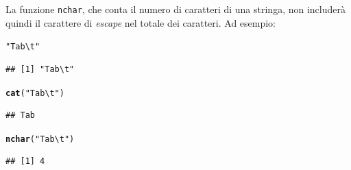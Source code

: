 \documentclass[onecolumn,12pt]{book}\usepackage[]{graphicx}\usepackage[]{color}
\makeatletter
\newcommand{\hlstr}[1]{\textcolor[rgb]{0.192,0.494,0.8}{#1}}%
\newcommand{\hlstd}[1]{\textcolor[rgb]{0.345,0.345,0.345}{#1}}%
\newcommand{\hlkwd}[1]{\textcolor[rgb]{0.737,0.353,0.396}{\textbf{#1}}}%
\newenvironment{kframe}{%
 \def\at@end@of@kframe{}%
 \ifinner\ifhmode%
  \def\at@end@of@kframe{\end{minipage}}%
  \begin{minipage}{\columnwidth}%
 \fi\fi%
 \def\FrameCommand##1{\hskip\@totalleftmargin \hskip-\fboxsep
 \colorbox{shadecolor}{##1}\hskip-\fboxsep
     \hskip-\linewidth \hskip-\@totalleftmargin \hskip\columnwidth}%
 \MakeFramed {\advance\hsize-\width
   \@totalleftmargin\z@ \linewidth\hsize
   \@setminipage}}%
 {\par\unskip\endMakeFramed%
 \at@end@of@kframe}
\newenvironment{knitrout}{}{} %
\makeatother
\begin{document}
La funzione \texttt{nchar},  che conta il numero di caratteri di una stringa, non includer\`a quindi il carattere di \emph{escape} nel totale dei caratteri. Ad esempio:
\begin{knitrout}
\color{fgcolor}\begin{kframe}
\begin{alltt}
\hlstr{"Tab\textbackslash{}t"}
\end{alltt}
\begin{verbatim}
## [1] "Tab\t"
\end{verbatim}
\begin{alltt}
\hlkwd{cat}\hlstd{(}\hlstr{"Tab\textbackslash{}t"}\hlstd{)}
\end{alltt}
\begin{verbatim}
## Tab	
\end{verbatim}
\begin{alltt}
\hlkwd{nchar}\hlstd{(}\hlstr{"Tab\textbackslash{}t"}\hlstd{)}
\end{alltt}
\begin{verbatim}
## [1] 4
\end{verbatim}
\end{kframe}
\end{knitrout}
\end{document}

